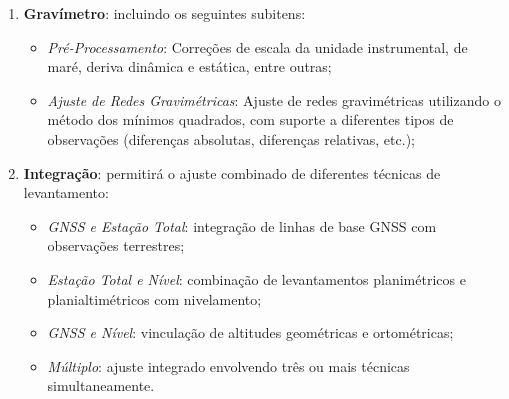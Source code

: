 \documentclass[
        12pt,                           %
        openright,                      %
        oneside,
        a4paper,                        %
        chapter=TITLE,         %
        section=TITLE,         %
        subsection=Title,      %
        english,                        %
        portugues,                      %
        ]{abntex2}
\begin{document}
\begin{enumerate}[label=\arabic*.]
    \item \textbf{Gravímetro}: incluindo os seguintes subitens:
    \begin{itemize}
        \item \textit{Pré-Processamento}: Correções de escala da unidade instrumental, de maré, deriva dinâmica e estática, entre outras;
        \item \textit{Ajuste de Redes Gravimétricas}: Ajuste de redes gravimétricas utilizando o método dos mínimos quadrados, com suporte a diferentes tipos de observações (diferenças absolutas, diferenças relativas, etc.);
    \end{itemize}
    
    \item \textbf{Integração}: permitirá o ajuste combinado de diferentes técnicas de levantamento:
    \begin{itemize}
        \item \textit{GNSS e Estação Total}: integração de linhas de base GNSS com observações terrestres;
        \item \textit{Estação Total e Nível}: combinação de levantamentos planimétricos e planialtimétricos com nivelamento;
        \item \textit{GNSS e Nível}: vinculação de altitudes geométricas e ortométricas;
        \item \textit{Múltiplo}: ajuste integrado envolvendo três ou mais técnicas simultaneamente.
    \end{itemize}
    

\end{enumerate}
\end{document}
